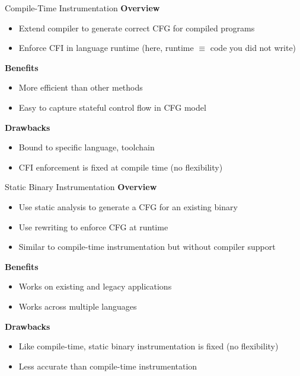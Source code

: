 \documentclass[12pt, dvipsnames, aspectratio=169]{beamer}
\newcommand{\red}[1]{{\color{red}#1}}
\newcommand{\blue}[1]{{\color{blue}#1}}
\begin{document}

\begin{frame}[c]{Compile-Time Instrumentation}{}
  {\bf Overview}
  \begin{itemize}
    \item Extend compiler to generate correct CFG for compiled programs
    \item Enforce CFI in language runtime (here, runtime $\equiv$ code you did not write)
  \end{itemize}

  \vfill
  {\bf \blue{Benefits}}
  \begin{itemize}
    \item More efficient than other methods
    \item Easy to capture stateful control flow in CFG model
  \end{itemize}

  \vfill
  {\bf \red{Drawbacks}}
  \begin{itemize}
    \item Bound to specific language, toolchain
    \item CFI enforcement is fixed at compile time (no flexibility)
  \end{itemize}
\end{frame}

\begin{frame}[c]{Static Binary Instrumentation}{}
  {\bf Overview}
  \begin{itemize}
    \item Use static analysis to generate a CFG for an existing binary
    \item Use rewriting to enforce CFG at runtime
    \item Similar to compile-time instrumentation but without compiler support
  \end{itemize}

  \vfill
  {\bf \blue{Benefits}}
  \begin{itemize}
    \item Works on existing and legacy applications
    \item Works across multiple languages
  \end{itemize}

  \vfill
  {\bf \red{Drawbacks}}
  \begin{itemize}
    \item Like compile-time, static binary instrumentation is fixed (no flexibility)
    \item Less accurate than compile-time instrumentation
  \end{itemize}
\end{frame}
\end{document}

